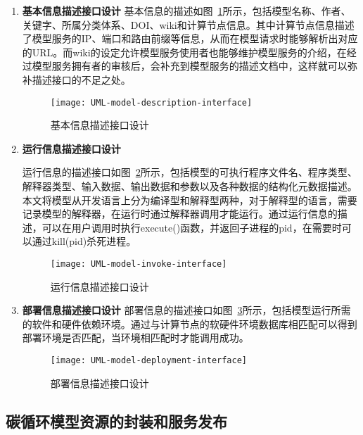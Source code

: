 \begin{enumerate}[(1)]
\item \textbf{基本信息描述接口设计}
基本信息的描述如图~\ref{fig:UML-model-description-interface}所示，包括模型名称、作者、关键字、所属分类体系、DOI、wiki和计算节点信息。其中计算节点信息描述了模型服务的IP、端口和路由前缀等信息，从而在模型请求时能够解析出对应的URL。而wiki的设定允许模型服务使用者也能够维护模型服务的介绍，在经过模型服务拥有者的审核后，会补充到模型服务的描述文档中，这样就可以弥补描述接口的不足之处。

\begin{figure}[!htbp]
    \centering
    \texttt{[image: UML-model-description-interface]}
    \caption{基本信息描述接口设计}
    \label{fig:UML-model-description-interface}
\end{figure}

\item \textbf{运行信息描述接口设计}
\label{sec:io-interface}

运行信息的描述接口如图~\ref{fig:UML-model-invoke-interface}所示，包括模型的可执行程序文件名、程序类型、解释器类型、输入数据、输出数据和参数以及各种数据的结构化元数据描述。本文将模型从开发语言上分为编译型和解释型两种，对于解释型的语言，需要记录模型的解释器，在运行时通过解释器调用才能运行。通过运行信息的描述，可以在用户调用时执行execute()函数，并返回子进程的pid，在需要时可以通过kill(pid)杀死进程。

\begin{figure}[!htbp]
    \centering
    \texttt{[image: UML-model-invoke-interface]}
    \caption{运行信息描述接口设计}
    \label{fig:UML-model-invoke-interface}
\end{figure}

\item \textbf{部署信息描述接口设计}
部署信息的描述接口如图~\ref{fig:UML-model-deployment-interface}所示，包括模型运行所需的软件和硬件依赖环境。通过与计算节点的软硬件环境数据库相匹配可以得到部署环境是否匹配，当环境相匹配时才能调用成功。

\begin{figure}[!htbp]
    \centering
    \texttt{[image: UML-model-deployment-interface]}
    \caption{部署信息描述接口设计}
    \label{fig:UML-model-deployment-interface}
\end{figure}
\end{enumerate}

\subsection{碳循环模型资源的封装和服务发布}

